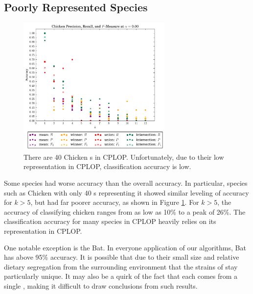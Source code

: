 \subsection{Poorly Represented Species}
\begin{figure}[t]
\centering
\includegraphics[width=3in]{figures/krap/Chicken-ALL-metrics-12-0_000}
\caption{There are 40 Chicken \isol{}s in CPLOP. Unfortunately, due to their low representation in CPLOP, classification accuracy is low.}
\label{fig:k_chicken}
\end{figure}
Some species had worse accuracy than the overall accuracy. In particular, species such as Chicken with only 40 \isol{}s representing it showed similar leveling of accuracy for $k>5$, but had far poorer accuracy, as shown in Figure \ref{fig:k_chicken}. For $k>5$, the accuracy of classifying chicken ranges from as low as 10\% to a peak of 26\%. The classification accuracy for many species in CPLOP heavily relies on its representation in CPLOP.

One notable exception is the Bat. In everyone application of our \kNN{} algorithms, Bat has above 95\% accuracy. It is possible that due to their small size and relative dietary segregation from the surrounding environment that the strains of \ecoli{} stay particularly unique. It may also be a quirk of the fact that each \isol{} comes from a single \host{}, making it difficult to draw conclusions from such results.